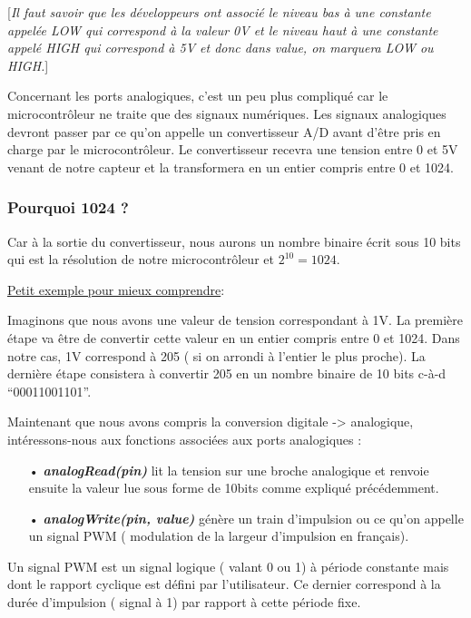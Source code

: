 \documentclass[12pt,a4paper]{article}
\begin{document}
 [\textit{Il faut savoir que les développeurs ont associé le niveau bas à une constante appelée LOW qui correspond à la valeur 0V et le niveau haut à une constante appelé HIGH qui correspond à 5V et donc dans value, on marquera LOW ou HIGH.}]
 
\bigskip
 
 Concernant les ports analogiques, c’est un peu plus compliqué car le microcontrôleur ne traite que des signaux numériques. Les signaux analogiques devront passer par ce qu’on appelle un convertisseur A/D avant d’être pris en charge par le microcontrôleur. Le convertisseur recevra une tension entre 0 et 5V venant de notre capteur et la transformera en un entier compris entre 0 et 1024.

\subsubsection*{Pourquoi 1024 ?} 
Car à la sortie du convertisseur, nous aurons un nombre binaire écrit sous 10 bits qui est la résolution de notre microcontrôleur et $2^{10}=1024$.

\bigskip
\underline{Petit exemple pour mieux comprendre}: 

\bigskip
Imaginons que nous avons une valeur de tension correspondant à 1V. La première étape va être de convertir cette valeur en un entier compris entre 0 et 1024. 
Dans notre cas, 1V correspond à 205 ( si on arrondi à l’entier le plus proche). La dernière étape consistera à convertir 205 en un nombre binaire de 10 bits c-à-d “00011001101”.

\bigskip
Maintenant que nous avons compris la conversion digitale -> analogique, intéressons-nous aux fonctions associées aux ports analogiques :

\bigskip
\begin{itemize}
   \item[•] \textit{\textbf{analogRead(pin)}}  lit la tension sur une broche analogique et renvoie ensuite la valeur lue sous forme de 10bits comme expliqué précédemment.
   \bigskip
   \item[•] \textit{\textbf{analogWrite(pin, value)}}  génère un train d’impulsion ou ce qu’on appelle un signal PWM ( modulation de la largeur d’impulsion en français).  
\end{itemize}
\bigskip

Un signal PWM est un signal logique ( valant 0 ou 1) à période constante mais dont le rapport cyclique est défini par l’utilisateur. Ce dernier correspond à la durée d’impulsion ( signal à 1) par rapport à cette période fixe.
 
\end{document}
